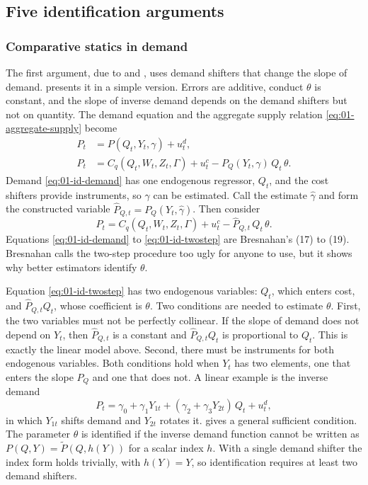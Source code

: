 \subsection{Five identification arguments}\label{sec:01-id-arguments}

\subsubsection{Comparative statics in demand}\label{sec:01-id-demand}

The first argument, due to \citet{Bresnahan1982} and \citet{Lau1982}, uses demand shifters that change the slope of
demand. \citet[Section~3.1]{Bresnahan1989} presents it in a simple version. Errors are additive, conduct $\theta$ is
constant, and the slope of inverse demand depends on the demand shifters but not on quantity. The demand equation and
the aggregate supply relation \eqref{eq:01-aggregate-supply} become
\begin{align}
P_t &= P(Q_t, Y_t, \gamma) + u^d_t, \label{eq:01-id-demand}\\
P_t &= C_q(Q_t, W_t, Z_t, \Gamma) + u^c_t - P_Q(Y_t, \gamma)\, Q_t\, \theta . \label{eq:01-id-supply}
\end{align}
Demand \eqref{eq:01-id-demand} has one endogenous regressor, $Q_t$, and the cost shifters provide instruments, so
$\gamma$ can be estimated. Call the estimate $\hat\gamma$ and form the constructed variable
$\hat P_{Q,t} = P_Q(Y_t, \hat\gamma)$. Then consider
\begin{equation}\label{eq:01-id-twostep}
P_t = C_q(Q_t, W_t, Z_t, \Gamma) + u^c_t - \hat P_{Q,t}\, Q_t\, \theta .
\end{equation}
Equations \eqref{eq:01-id-demand} to \eqref{eq:01-id-twostep} are Bresnahan's (17) to (19). Bresnahan calls the
two-step procedure too ugly for anyone to use, but it shows why better estimators identify $\theta$.

Equation \eqref{eq:01-id-twostep} has two endogenous variables: $Q_t$, which enters cost, and $\hat P_{Q,t}Q_t$, whose
coefficient is $\theta$. Two conditions are needed to estimate $\theta$. First, the two variables must not be
perfectly collinear. If the slope of demand does not depend on $Y_t$, then $\hat P_{Q,t}$ is a constant and
$\hat P_{Q,t}Q_t$ is proportional to $Q_t$. This is exactly the linear model above. Second, there must be instruments
for both endogenous variables. Both conditions hold when $Y_t$ has two elements, one that enters the slope $P_Q$ and one
that does not. A linear example is the inverse demand
\begin{equation*}
P_t = \gamma_0 + \gamma_1 Y_{1t} + (\gamma_2 + \gamma_3 Y_{2t})\, Q_t + u^d_t ,
\end{equation*}
in which $Y_{1t}$ shifts demand and $Y_{2t}$ rotates it. \citet{Lau1982} gives a general sufficient condition. The
parameter $\theta$ is identified if the inverse demand function cannot be written as $P(Q, Y) = \tilde P(Q, h(Y))$ for
a scalar index $h$. With a single demand shifter the index form holds trivially, with $h(Y) = Y$, so
identification requires at least two demand shifters.

